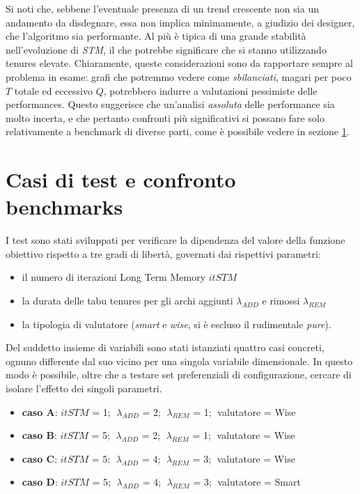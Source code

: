 Si noti che, sebbene l'eventuale presenza di un trend crescente non sia un andamento da disdegnare, essa non implica minimamente,
 a giudizio dei designer, che l'algoritmo sia performante. Al più è tipica di una grande stabilità nell'evoluzione 
di \emph{STM}, il che potrebbe significare che si stanno utilizzando tenures elevate. Chiaramente, queste considerazioni sono da rapportare sempre al problema in esame:
grafi che potremmo vedere come \emph{sbilanciati}, magari per poco $T$ totale ed eccessivo $Q$, potrebbero indurre a valutazioni pessimiste delle performances.
Questo suggerisce che un'analisi \emph{assoluta} delle performance sia molto incerta, e che pertanto confronti più significativi si possano fare solo relativamente a benchmark di diverse parti,
come è possibile vedere in sezione \ref{sec:testcases}. 

\section{Casi di test e confronto benchmarks}
\label{sec:testcases} 
I test sono stati sviluppati per verificare la dipendenza del valore della funzione obiettivo rispetto a tre gradi di libertà, governati dai rispettivi parametri:
\begin{itemize}
	\item il numero di iterazioni Long Term Memory $itSTM$
	\item la durata delle tabu tenures per gli archi aggiunti $\lambda_{ADD}$ e rimossi $\lambda_{REM}$
	\item la tipologia di valutatore (\emph{smart} e \emph{wise}, si è escluso il rudimentale \emph{pure}).
\end{itemize}
Del suddetto insieme di variabili sono stati istanziati quattro casi concreti, ognuno differente dal suo vicino per una singola variabile dimensionale.
In questo modo è possibile, oltre che a testare set preferenziali di configurazione, cercare di isolare l'effetto dei singoli parametri.
\begin{itemize}
\item \textbf{caso A}: $itSTM$ = 1; $\;\lambda_{ADD}$ = 2; $\;\lambda_{REM}$ = 1; $\;$valutatore = Wise
\item \textbf{caso B}: $itSTM$ = 5; $\;\lambda_{ADD}$ = 2; $\;\lambda_{REM}$ = 1; $\;$valutatore = Wise
\item \textbf{caso C}: $itSTM$ = 5; $\;\lambda_{ADD}$ = 4; $\;\lambda_{REM}$ = 3; $\;$valutatore = Wise
\item \textbf{caso D}: $itSTM$ = 5; $\;\lambda_{ADD}$ = 4; $\;\lambda_{REM}$ = 3; $\;$valutatore = Smart
\end{itemize}

